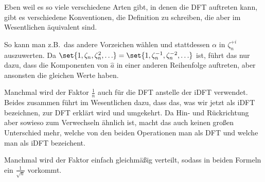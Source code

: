 \begin{remark}
    Eben weil es so viele verschiedene Arten gibt, in denen die DFT auftreten kann, gibt es verschiedene Konventionen, die Definition zu schreiben, die aber im Wesentlichen äquivalent sind.

    So kann man z.B.\ das andere Vorzeichen wählen und stattdessen $\alpha$ in $\zeta_n^{+i}$ auszuwerten. Da $\set{1, \zeta_n, \zeta_n^2, \ldots} = \set{1, \zeta_n^{-1}, \zeta_n^{-2}, \ldots}$ ist, führt das nur dazu, dass die Komponenten von $\hat{a}$ in einer anderen Reihenfolge auftreten, aber ansonsten die gleichen Werte haben.

    Manchmal wird der Faktor $\frac{1}{n}$ auch für die DFT anstelle der iDFT verwendet. Beides zusammen führt im Wesentlichen dazu, dass das, was wir jetzt als iDFT bezeichnen, zur DFT erklärt wird und umgekehrt. Da Hin- und Rückrichtung aber sowieso zum Verwechseln ähnlich ist, macht das auch keinen großen Unterschied mehr, welche von den beiden Operationen man als DFT und welche man als iDFT bezeichent.

    Manchmal wird der Faktor einfach gleichmäßig verteilt, sodass in beiden Formeln ein $\frac{1}{\sqrt{n}}$ vorkommt.
\end{remark}

